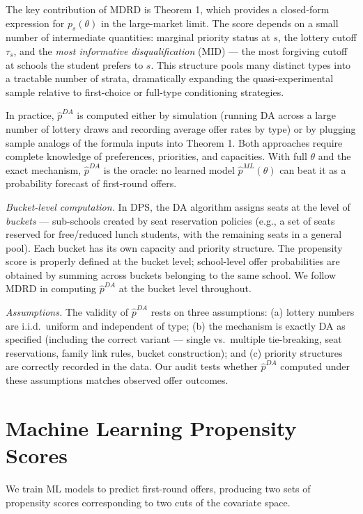 \documentclass[12pt,a4paper,dvipsnames]{article}
\begin{document}
The key contribution of MDRD is Theorem 1, which provides a closed-form expression for $p_s(\theta)$ in the large-market limit. The score depends on a small number of intermediate quantities: marginal priority status at $s$, the lottery cutoff $\tau_s$, and the \textit{most informative disqualification} (MID) --- the most forgiving cutoff at schools the student prefers to $s$. This structure pools many distinct types into a tractable number of strata, dramatically expanding the quasi-experimental sample relative to first-choice or full-type conditioning strategies.

In practice, $\hat{p}^{DA}$ is computed either by simulation (running DA across a large number of lottery draws and recording average offer rates by type) or by plugging sample analogs of the formula inputs into Theorem 1. Both approaches require complete knowledge of preferences, priorities, and capacities. With full $\theta$ and the exact mechanism, $\hat{p}^{DA}$ is the oracle: no learned model $\hat{p}^{ML}(\theta)$ can beat it as a probability forecast of first-round offers.

\textit{Bucket-level computation.} In DPS, the DA algorithm assigns seats at the level of \textit{buckets} --- sub-schools created by seat reservation policies (e.g., a set of seats reserved for free/reduced lunch students, with the remaining seats in a general pool). Each bucket has its own capacity and priority structure. The propensity score is properly defined at the bucket level; school-level offer probabilities are obtained by summing across buckets belonging to the same school. We follow MDRD in computing $\hat{p}^{DA}$ at the bucket level throughout.

\textit{Assumptions.} The validity of $\hat{p}^{DA}$ rests on three assumptions: (a) lottery numbers are i.i.d.\ uniform and independent of type; (b) the mechanism is exactly DA as specified (including the correct variant --- single vs.\ multiple tie-breaking, seat reservations, family link rules, bucket construction); and (c) priority structures are correctly recorded in the data. Our audit tests whether $\hat{p}^{DA}$ computed under these assumptions matches observed offer outcomes.

\section{Machine Learning Propensity Scores}

We train ML models to predict first-round offers, producing two sets of propensity scores corresponding to two cuts of the covariate space.
\end{document}
